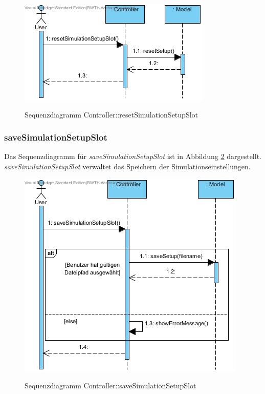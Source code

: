 \begin{figure}[H]
	\centering
	\includegraphics[scale=.8]{Bilder/Controller__resetSimulationSetupSlot().jpg}\\
	\caption{Sequenzdiagramm Controller::resetSimulationSetupSlot}
	\label{Sequenzdiagramm Controller::resetSimulationSetupSlot}
\end{figure}

\subsubsection*{saveSimulationSetupSlot}

Das Sequenzdiagramm für \emph{saveSimulationSetupSlot} ist in Abbildung \ref{Sequenzdiagramm Controller::saveSimulationSetupSlot} dargestellt. \emph{saveSimulationSetupSlot} verwaltet das Speichern der Simulationseinstellungen.

\begin{figure}[H]
	\centering
	\includegraphics[scale=.75]{Bilder/Controller__saveSimulationSetupSlot().jpg}\\
	\caption{Sequenzdiagramm Controller::saveSimulationSetupSlot}
	\label{Sequenzdiagramm Controller::saveSimulationSetupSlot}
\end{figure}
\newpage

